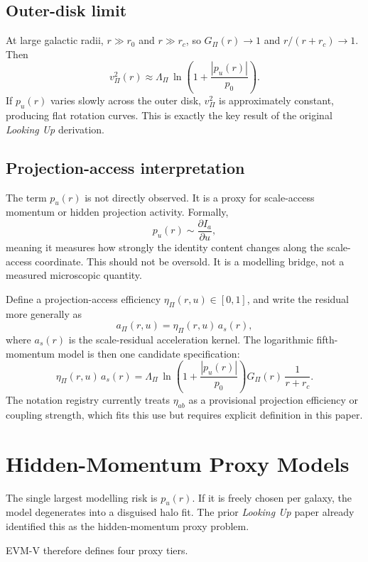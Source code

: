 \documentclass[11pt,a4paper,oneside]{article}
\newcommand{\Ia}{I_a}
\newcommand{\aPi}{a_{\Pi}}
\newcommand{\ascale}{a_s}
\newcommand{\vPi}{v_{\Pi}}
\newcommand{\LamPi}{\Lambda_{\Pi}}
\newcommand{\pzero}{p_0}
\newcommand{\rc}{r_c}
\newcommand{\rzero}{r_0}
\newcommand{\pu}{p_u}
\newcommand{\usc}{u}                    %
\newcommand{\etaPi}{\eta_{\Pi}}
\newcommand{\etaab}{\eta_{ab}}
\newcommand{\GPi}{G_{\Pi}}
\begin{document}
\subsection{Outer-disk limit}

At large galactic radii, $r \gg \rzero$ and $r \gg \rc$, so $\GPi(r) \to 1$ and
$r/(r+\rc) \to 1$. Then
\[
    \vPi^2(r) \approx \LamPi\,\ln\!\left(1 + \frac{|\pu(r)|}{\pzero}\right).
\]
If $\pu(r)$ varies slowly across the outer disk, $\vPi^2$ is approximately constant,
producing flat rotation curves. This is exactly the key result of the original
\emph{Looking Up} derivation.

\subsection{Projection-access interpretation}

The term $\pu(r)$ is not directly observed. It is a proxy for scale-access momentum
or hidden projection activity. Formally,
\[
    \pu(r) \sim \frac{\partial \Ia}{\partial \usc},
\]
meaning it measures how strongly the identity content changes along the scale-access
coordinate. This should not be oversold. It is a modelling bridge, not a measured
microscopic quantity.

Define a projection-access efficiency $\etaPi(r,\usc) \in [0,1]$, and write the
residual more generally as
\[
    \aPi(r,\usc) = \etaPi(r,\usc)\,\ascale(r),
\]
where $\ascale(r)$ is the scale-residual acceleration kernel. The logarithmic
fifth-momentum model is then one candidate specification:
\[
    \etaPi(r,\usc)\,\ascale(r)
    = \LamPi\,\ln\!\left(1+\frac{|\pu(r)|}{\pzero}\right)
      \GPi(r)\,\frac{1}{r+\rc}.
\]
The notation registry currently treats $\etaab$ as a provisional projection efficiency
or coupling strength, which fits this use but requires explicit definition in this paper.

\section{Hidden-Momentum Proxy Models}

The single largest modelling risk is $\pu(r)$. If it is freely chosen per galaxy, the
model degenerates into a disguised halo fit. The prior \emph{Looking Up} paper already
identified this as the hidden-momentum proxy problem.

EVM-V therefore defines four proxy tiers.
\end{document}
